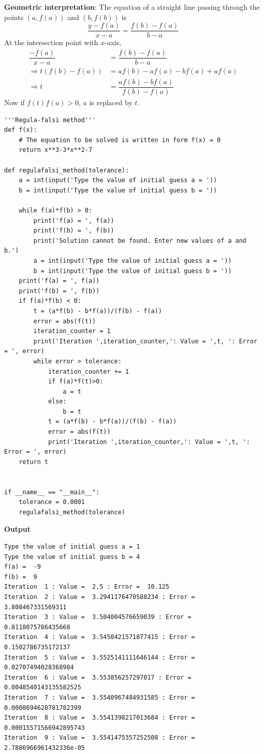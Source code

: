 \documentclass[a4paper,11pt]{book}
\begin{document}
\noindent \textbf{Geometric interpretation}: The equation of a straight line passing through the points $(a, f(a))$ and $(b, f(b))$ is
$$\dfrac{y-f(a)}{x-a} = \dfrac{f(b)-f(a)}{b-a}$$
\noindent At the intersection point with $x$-axis,
\begin{align*}
    \dfrac{-f(a)}{x-a} &= \dfrac{f(b)-f(a)}{b-a}\\
    \Rightarrow t\left(f(b)-f(a)\right) &= af(b)-af(a)-bf(a)+af(a)\\
    \Rightarrow t &= \dfrac{af(b)-bf(a)}{f(b)-f(a)}
\end{align*}
\noindent Now if $f(t)f(a) > 0$, $a$ is replaced by $t$.
\begin{lstlisting}
'''Regula-falsi method'''
def f(x):
    # The equation to be solved is written in form f(x) = 0
    return x**3-3*x**2-7

def regulafalsi_method(tolerance):
    a = int(input('Type the value of initial guess a = '))
    b = int(input('Type the value of initial guess b = '))
    
    while f(a)*f(b) > 0:
        print('f(a) = ', f(a))
        print('f(b) = ', f(b))
        print('Solution cannot be found. Enter new values of a and b.')
        a = int(input('Type the value of initial guess a = '))
        b = int(input('Type the value of initial guess b = '))
    print('f(a) = ', f(a))
    print('f(b) = ', f(b))
    if f(a)*f(b) < 0:
        t = (a*f(b) - b*f(a))/(f(b) - f(a))
        error = abs(f(t))
        iteration_counter = 1
        print('Iteration ',iteration_counter,': Value = ',t, ': Error = ', error)
        while error > tolerance:
            iteration_counter += 1
            if f(a)*f(t)>0: 
                a = t
            else:
                b = t          
            t = (a*f(b) - b*f(a))/(f(b) - f(a))
            error = abs(f(t))
            print('Iteration ',iteration_counter,': Value = ',t, ': Error = ', error)
    return t


if __name__ == "__main__":
    tolerance = 0.0001
    regulafalsi_method(tolerance)
\end{lstlisting}
\textbf{Output}
\begin{lstlisting}
Type the value of initial guess a = 1
Type the value of initial guess b = 4
f(a) =  -9
f(b) =  9
Iteration  1 : Value =  2.5 : Error =  10.125
Iteration  2 : Value =  3.2941176470588234 : Error =  3.808467331569311
Iteration  3 : Value =  3.504004576659039 : Error =  0.8118075786435668
Iteration  4 : Value =  3.5450421571877415 : Error =  0.1502786735172137
Iteration  5 : Value =  3.5525141111646144 : Error =  0.02707494028368984
Iteration  6 : Value =  3.553856257297017 : Error =  0.0048540143135582525
Iteration  7 : Value =  3.5540967484931585 : Error =  0.0008694628781782399
Iteration  8 : Value =  3.5541398217013684 : Error =  0.00015571566942895743
Iteration  9 : Value =  3.5541475357252508 : Error =  2.7886966961432336e-05
\end{lstlisting}
\end{document}
